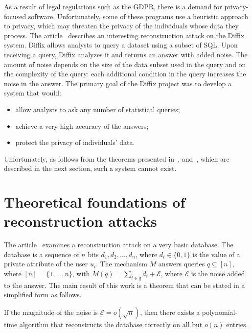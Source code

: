 As a result of legal regulations such as the GDPR, there is a demand for privacy-focused software. Unfortunately, some of these programs use a heuristic approach to privacy, which may threaten the privacy of the individuals whose data they process. The article~\cite{LINEAR_PROGRAM_RECONSTRUCTION_IN_PRACTICE} describes an interesting reconstruction attack on the Diffix system. Diffix allows analysts to query a dataset using a subset of SQL. Upon receiving a query, Diffix analyzes it and returns an answer with added noise. The amount of noise depends on the size of the data subset used in the query and on the complexity of the query: each additional condition in the query increases the noise in the answer. The primary goal of the Diffix project was to develop a system that would:
\begin{itemize}
  \item allow analysts to ask any number of statistical queries;
  \item achieve a very high accuracy of the answers;
  \item protect the privacy of individuals' data.
\end{itemize}
Unfortunately, as follows from the theorems presented in~\cite{Revealing_Information_while_Preserving_Privacy}, \cite{The_Price_of_Privacy_and_the_Limits_of_LP_Decoding} and~\cite{New_Efficient_Attacks_on_Statistical_Disclosure_Control_Mechanisms}, which are described in the next section, such a system cannot exist.

\section{Theoretical foundations of reconstruction attacks}

The article~\cite{Revealing_Information_while_Preserving_Privacy} examines a reconstruction attack on a very basic database. The database is a sequence of $n$ bits $d_1, d_2, \ldots, d_n$, where $d_i \in \{0, 1\}$ is the value of a private attribute of the user $u_i$. The mechanism $M$ answers queries $q \subseteq [n]$, where $[n] = \{1, \ldots, n\}$, with $M(q) = \sum_{i \in q} d_i + \mathcal{E}$, where $\mathcal{E}$ is the noise added to the answer. The main result of this work is a theorem that can be stated in a simplified form as follows.

\begin{theorem}
If the magnitude of the noise is $\mathcal{E} = o(\sqrt{n})$, then there exists a polynomial-time algorithm that reconstructs the database correctly on all but $o(n)$ entries.
\end{theorem}

